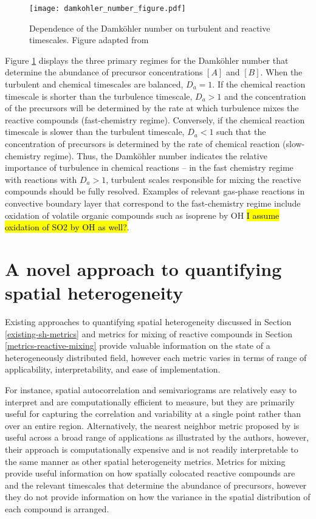 \begin{figure}[h]
	\centering
	\texttt{[image: damkohler\_number\_figure.pdf]}
	\caption{Dependence of the Damköhler number on turbulent and reactive timescales. Figure adapted from \cite{kotamarthi_and_2017}}
	\label{fig:damkohler}
\end{figure}

Figure \ref{fig:damkohler} displays the three primary regimes for the Damköhler number that determine the abundance of precursor concentrations $[A]$ and $[B]$. When the turbulent and chemical timescales are balanced, $D_a = 1$. If the chemical reaction timescale is shorter than the turbulence timescale, $D_a >1$ and the concentration of the precursors will be determined by the rate at which turbulence mixes the reactive compounds (fast-chemistry regime). Conversely, if the chemical reaction timescale is slower than the turbulent timescale, $D_a<1$ such that the concentration of precursors is determined by the rate of chemical reaction (slow-chemistry regime). Thus, the Damköhler number indicates the relative importance of turbulence in chemical reactions -- in the fast chemistry regime with  reactions with $D_a > 1$, turbulent scales responsible for mixing the reactive compounds should be fully resolved. Examples of relevant gas-phase reactions in convective boundary layer that correspond to the fast-chemistry regime include oxidation of volatile organic compounds such as isoprene by OH \hl{I assume oxidation of SO2 by OH as well?}.

\section{A novel approach to quantifying spatial heterogeneity}
Existing approaches to quantifying spatial heterogeneity discussed in Section \ref{existing-sh-metrics} and metrics for mixing of reactive compounds in Section \ref{metrics-reactive-mixing} provide valuable information on the state of a heterogeneously distributed field, however each metric varies in terms of range of applicability, interpretability, and ease of implementation. 

For instance, spatial autocorrelation and semivariograms are relatively easy to interpret and are computationally efficient to measure, but they are primarily useful for capturing the correlation and variability at a single point rather than over an entire region. Alternatively, the nearest neighbor metric proposed by \cite{shu_quantifying_2019} is useful across a broad range of applications as illustrated by the authors, however, their approach is computationally expensive and is not readily interpretable to the same manner as other spatial heterogeneity metrics. Metrics for mixing provide useful information on how spatially colocated reactive compounds are and the relevant timescales that determine the abundance of precursors, however they do not provide information on how the variance in the spatial distribution of each compound is arranged. 

